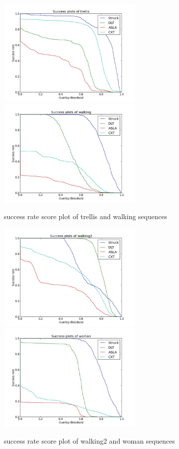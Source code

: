 \documentclass{article}
\begin{document}
\begin{figure}[hbt]
  \includegraphics[width=200pt]{trellis.jpg}
  \includegraphics[width=200pt]{walking.jpg}
  \label{fig:walking}
  \caption{success rate score plot of trellis and walking sequences}
\end{figure}

\begin{figure}[hbt]
  \includegraphics[width=200pt]{walking2.jpg}
  \includegraphics[width=200pt]{woman.jpg}
  \label{fig:woman}
  \caption{success rate score plot of walking2 and woman sequences}
\end{figure}
\end{document}
